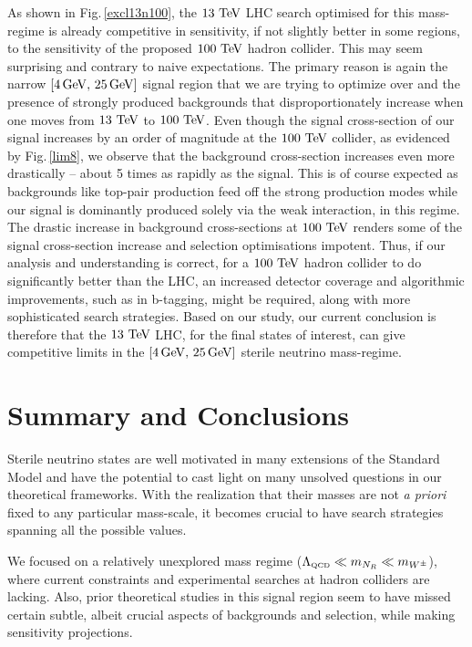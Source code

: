 \documentclass[reprint,doublecolumn,secnumarabic,amssymb, amsmath, aps,nofootinbib,superscriptaddress]{revtex4-1}
\newcommand{\Fig}[1]{Fig.\,\ref{#1}}
\def\TeV{\ifmmode {\mathrm{\ Te\kern -0.1em V}}\else
                   \textrm{Te\kern -0.1em V}\fi}%
\begin{document}
As shown in \Fig{excl13n100}, the $13\TeV$ LHC search optimised for this mass-regime is already competitive in sensitivity, if not slightly better in some regions, to the sensitivity of the proposed $100\TeV$ hadron collider. This may seem surprising and contrary to naive expectations. The primary reason is again the narrow $[4\,\rm{GeV},\,25\,\rm{GeV}]$ signal region that we are trying to optimize over and the presence of strongly produced backgrounds that disproportionately increase when one moves from $13\TeV$ to $100\TeV$. Even though the signal cross-section of our signal increases by an order of magnitude at the $100\TeV$ collider, as evidenced by Fig.\,\ref{lim8}, we observe that the background cross-section increases even more drastically -- about 5 times as rapidly as the signal. This is of course expected as backgrounds like top-pair production feed off the strong production modes while our signal is dominantly produced solely via the weak interaction, in this regime. The drastic increase in background cross-sections at $100\TeV$ renders some of the signal cross-section increase and selection optimisations impotent. Thus, if our analysis and understanding is correct, for a $100\TeV$ hadron collider to do significantly better than the LHC, an increased detector coverage and algorithmic improvements, such as in b-tagging, might be required, along with more sophisticated search strategies. Based on our study, our current conclusion is therefore that the $13\TeV$ LHC, for the final states of interest, can give competitive limits in the $[4\,\rm{GeV},\,25\,\rm{GeV}]$ sterile neutrino mass-regime.



\section {\label{sec:5} Summary and Conclusions}
\label{sec:5}
Sterile neutrino states are well motivated in many extensions of the Standard Model and have the potential to cast light on many unsolved questions in our theoretical frameworks. With the realization that their masses are not \textit{a priori} fixed to any particular mass-scale, it becomes crucial to have search strategies spanning all the possible values. 

We focused on a relatively unexplored mass regime ($\Lambda_{\text{\tiny{QCD}}} \ll m_{N_R} \ll m_{W^\pm}$), where current constraints and experimental searches at hadron colliders are lacking. Also, prior theoretical studies in this signal region seem to have missed certain subtle, albeit crucial aspects of backgrounds and selection, while making sensitivity projections. 
\end{document}
